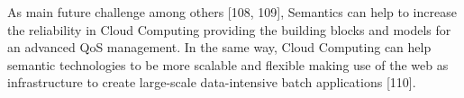\begin{itemize}
 
\end{itemize}

As main future challenge among others [108, 109], Semantics can help to increase the reliability in Cloud Computing providing the building blocks and models for an advanced QoS management. In the same way, Cloud Computing can help semantic technologies to be more scalable and flexible making use of the web as infrastructure to create large-scale data-intensive batch applications [110].

